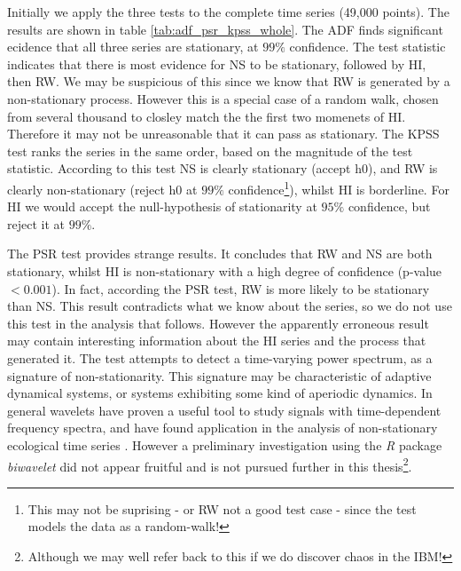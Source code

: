 Initially we apply the three tests to the complete time series (49,000 points). The results are shown in table \ref{tab:adf_psr_kpss_whole}. The ADF finds significant ecidence that all three series are stationary, at $99\%$ confidence. The test statistic indicates that there is most evidence for NS to be stationary, followed by HI, then RW. We may be suspicious of this since we know that RW is generated by a non-stationary process. However this is a special case of a random walk, chosen from several thousand to closley match the the first two momenets of HI. Therefore it may not be unreasonable that it can pass as stationary. The KPSS test ranks the series in the same order, based on the magnitude of the test statistic. According to this test NS is clearly stationary (accept h0), and RW is clearly non-stationary (reject h0 at $99\%$ confidence\footnote{This may not be suprising - or RW not a good test case - since the test models the data as a random-walk!}), whilst HI is borderline. For HI we would accept the null-hypothesis of stationarity at $95\%$ confidence, but reject it at $99\%$. 

The PSR test provides strange results. It concludes that RW and NS are both stationary, whilst HI is non-stationary with a high degree of confidence (p-value$<0.001$). In fact, according the PSR test, RW is more likely to be stationary than NS. This result contradicts what we know about the series, so we do not use this test in the analysis that follows. However the apparently erroneous result may contain interesting information about the HI series and the process that generated it. The test attempts to detect a time-varying power spectrum, as a signature of non-stationarity. This signature may be characteristic of adaptive dynamical systems, or systems exhibiting some kind of aperiodic dynamics. In general wavelets have proven a useful tool to study signals with time-dependent frequency spectra, and have found application in the analysis of non-stationary ecological time series \cite{cazelles2008wavelet, nason2013test}. However a preliminary investigation using the \emph{R} package \emph{biwavelet} did not appear fruitful and is not pursued further in this thesis\footnote{Although we may well refer back to this if we do discover chaos in the IBM!}. 



